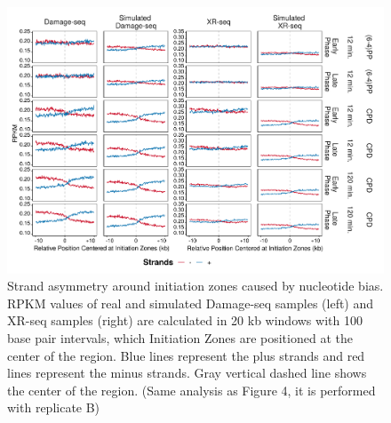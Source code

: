 \begin{figure}[H]
\begin{center}
\includegraphics[width=\textwidth]{Chapters/7_appendix/figures/supfig11}
\caption[Strand asymmetry around initiation zones caused by nucleotide bias.]{Strand asymmetry around initiation zones caused by nucleotide bias. RPKM values of real and simulated Damage-seq samples (left) and XR-seq samples (right) are calculated in 20 kb windows with 100 base pair intervals, which Initiation Zones are positioned at the center of the region. Blue lines represent the plus strands and red lines represent the minus strands. Gray vertical dashed line shows the center of the region. (Same analysis as Figure 4, it is performed with replicate B)}
\label{supfig:simulation}
\end{center}
\end{figure}


